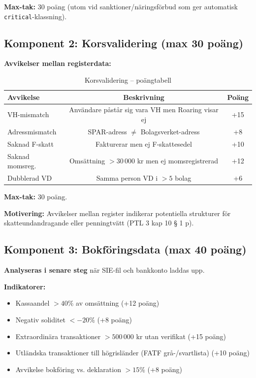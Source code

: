 \documentclass[12pt,a4paper]{article}
\begin{document}
\textbf{Max-tak:} 30 poäng (utom vid sanktioner/näringsförbud som ger automatisk \texttt{critical}-klassning).

\subsection{Komponent 2: Korsvalidering (max 30 poäng)}

\textbf{Avvikelser mellan registerdata:}

\begin{table}[h]
\centering
\begin{tabular}{lcc}
\toprule
\textbf{Avvikelse} & \textbf{Beskrivning} & \textbf{Poäng} \\
\midrule
VH-mismatch & Användare påstår sig vara VH men Roaring visar ej & +15 \\
Adressmismatch & SPAR-adress $\neq$ Bolagsverket-adress & +8 \\
Saknad F-skatt & Fakturerar men ej F-skattesedel & +10 \\
Saknad momsreg. & Omsättning $> 30\,000$ kr men ej momsregistrerad & +12 \\
Dubblerad VD & Samma person VD i $>5$ bolag & +6 \\
\bottomrule
\end{tabular}
\caption{Korsvalidering – poängtabell}
\end{table}

\textbf{Max-tak:} 30 poäng.

\textbf{Motivering:} Avvikelser mellan register indikerar potentiella strukturer för skatteundandragande eller penningtvätt (PTL 3 kap 10 § 1 p).

\subsection{Komponent 3: Bokföringsdata (max 40 poäng)}

\textbf{Analyseras i senare steg} när SIE-fil och bankkonto laddas upp.

\textbf{Indikatorer:}
\begin{itemize}[noitemsep]
  \item Kassaandel $> 40\%$ av omsättning (+12 poäng)
  \item Negativ soliditet $< -20\%$ (+8 poäng)
  \item Extraordinära transaktioner $> 500\,000$ kr utan verifikat (+15 poäng)
  \item Utländska transaktioner till högrisländer (FATF grå-/svartlista) (+10 poäng)
  \item Avvikelse bokföring vs. deklaration $> 15\%$ (+8 poäng)
\end{itemize}
\end{document}
